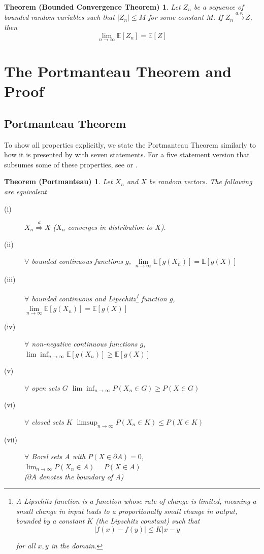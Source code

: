 \documentclass[11pt]{article}
\newtheorem*{portmanteautheorem}{Theorem (Portmanteau)}
\newtheorem*{bct}{Theorem (Bounded Convergence Theorem)}
\begin{document}
\begin{bct}
Let $Z_n$ be a sequence of bounded random variables such that $|Z_n| \le M$ for some constant $M$. If $Z_n \xrightarrow{a.s.} Z$, then 
$$ \lim_{n \rightarrow \infty} \mathbb{E}[Z_n] = \mathbb{E}[Z] $$
\end{bct}
\bigskip

\section{The Portmanteau Theorem and Proof}
\subsection{Portmanteau Theorem}
To show all properties explicitly, we state the Portmanteau Theorem similarly to how it is presented by \citet{vanderVaart1998} with seven statements. For a five statement version that subsumes some of these properties, see \citep{Billingsley1999} or \citep{durrett:2019}.
\begin{portmanteautheorem}
Let $X_n$ and $X$ be random vectors. The following are equivalent
\begin{description}
    \item[(i)] $X_n \overset{d}{\Rightarrow} X$ ($X_n$ converges in distribution to $X$).
    \item[(ii)] $\forall$ bounded continuous functions $g$, $\underset{n \rightarrow \infty}\lim \mathbb{E}[g(X_n)] = \mathbb{E}[g(X)]$
    \item[(iii)] $\forall$ bounded continuous and Lipschitz\footnote{A Lipschitz function is a function whose rate of change is limited, meaning a small change in input leads to a proportionally small change in output, bounded by a constant \(K\) (the Lipschitz constant) such that $$|f(x) - f(y)| \le K|x - y|$$ 
    
    for all $x, y$ in the domain.} function $g$, $\underset{n \rightarrow \infty}\lim \mathbb{E}[g(X_n)] = \mathbb{E}[g(X)]$
    \item[(iv)] $\forall$ non-negative continuous functions $g$, $\lim\inf_{n \longrightarrow \infty}\mathbb{E}[g(X_n)] \ge \mathbb{E}[g(X)]$
    \item[(v)] $\forall$ open sets $G$ $\lim\inf_{n \rightarrow \infty}P(X_n \in G) \ge P(X \in G)$ 
    \item[(vi)] $\forall$ closed sets $K$ $\limsup_{n \rightarrow \infty}P(X_n \in K) \le P(X \in K)$
    \item[(vii)] $\forall$ Borel sets $A$ with $P(X\in \partial A) = 0$, $\lim_{n \rightarrow \infty}P(X_n \in A) = P(X\in A)$\\ ($\partial A$ denotes the boundary of A)
\end{description} 
\end{portmanteautheorem}
\noindent
\end{document}

